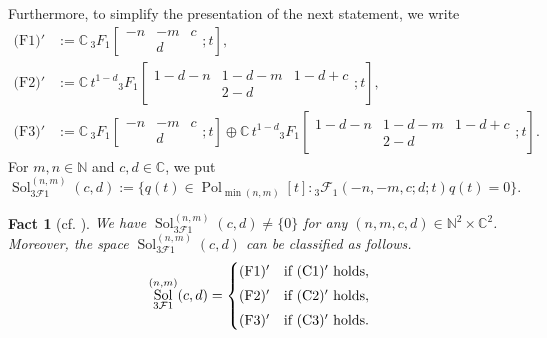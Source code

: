 \documentclass[a4paper,11pt,reqno]{amsart}
\newcommand{\CC}{\mathbb{C}}
\newcommand{\NN}{\mathbb{N}}
\newcommand{\calF}{\mathcal{F}}
\newcommand{\0}{{\bf 0}}
\newcommand{\N}{\mathbb{N}}
\newcommand{\C}{\mathbb{C}}
\newcommand{\1}{{\bf 1}}
\DeclareMathOperator{\Pol}{Pol}
\DeclareMathOperator{\Sol}{Sol}
\theoremstyle{plain}
\newtheorem{fact}[equation]{Fact}
\theoremstyle{definition}
\numberwithin{equation}{section}
\theoremstyle{definition}
\begin{document}
Furthermore, to simplify the presentation of the next statement, we write
\begin{align*}
\text{(F1)$'$}
&:=\CC\, 
{}_3F_1\left [\begin{matrix}
    -n& -m & c \\
   & d &  
\end{matrix};t\right ],
\\[3pt]
\text{(F2)$'$}
&:=
\CC\, 
t^{1-d}{}_3F_1\left [\begin{matrix}
    1-d-n & 1-d-m & 1-d+c \\
   & 2-d &  
\end{matrix};t\right ],
\\[3pt]
\text{(F3)$'$}
&:=
\CC\, 
{}_3F_1\left [\begin{matrix}
    -n& -m & c \\
   & d &  
\end{matrix};t\right ]
\oplus
\CC\, 
t^{1-d}{}_3F_1\left [\begin{matrix}
    1-d-n & 1-d-m & 1-d+c \\
   & 2-d &  
\end{matrix};t\right ].
\end{align*}
For $m, n \in \NN$ and $c, d \in\CC$, we put
\begin{equation*}
\Sol^{(n,m)}_{3\calF1}(c,d):=\{q(t) \in \Pol_{\min{(n,m)}}[t]: 
{}_3\calF_1(-n,-m,c;d;t)q(t)=0\}.
\end{equation*}

\begin{fact}[{cf. \cite[Eq. 16.8.6]{DLMF}}]
\label{fact:3F1-sols}
We have
$\Sol^{(n,m)}_{3\calF1}(c,d)\neq \{0\}$
for any $(n,m,c, d) \in \N^2\times \C^2$.
Moreover,
the space $\Sol^{(n,m)}_{3\calF1}(c,d)$
can be classified as follows.
\begin{equation*}
\Sol^{(n,m)}_{3\calF1}(c,d)
=
\begin{cases}
\textnormal{(F1)$'$}
& \textnormal{if (C1)$'$ holds},\\[3pt]
\textnormal{(F2)$'$}
& \textnormal{if (C2)$'$ holds},\\[3pt]
\textnormal{(F3)$'$}
& \textnormal{if (C3)$'$ holds}.
\end{cases}
\end{equation*}
\end{fact}
\end{document}
